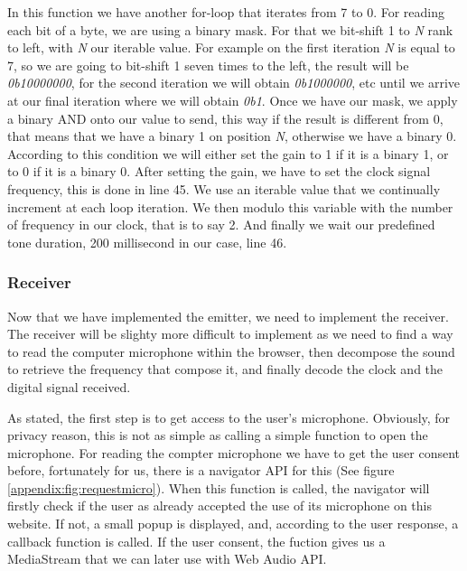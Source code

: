 \documentclass[twocolumn,14pt]{extarticle}
\begin{document}
In this function we have another for-loop that iterates from 7 to 0. For reading each bit of a byte, we are using a binary mask. For that we bit-shift 1 to \textit{N} rank to left, with \textit{N} our iterable value. For example on the first iteration \textit{N} is equal to 7, so we are going to bit-shift 1  seven times to the left, the result will be \textit{0b10000000}, for the second iteration we will obtain \textit{0b1000000}, etc until we arrive at our final iteration where we will obtain \textit{0b1}. Once we have our mask, we apply a binary AND onto our value to send, this way if the result is different from 0, that means that we have a binary 1 on position \textit{N}, otherwise we have a binary 0. According to this condition we will either set the gain to 1 if it is a binary 1, or to 0 if it is a binary 0. After setting the gain, we have to set the clock signal frequency, this is done in line 45. We use an iterable value that we continually increment at each loop iteration. We then modulo this variable with the number of frequency in our clock, that is to say 2. And finally we wait our predefined tone duration, 200 millisecond in our case, line 46.

\subsubsection{Receiver}
Now that we have implemented the emitter, we need to implement the receiver. The receiver will be slighty more difficult to implement as we need to find a way to read the computer microphone within the browser, then decompose the sound to retrieve the frequency that compose it, and finally decode the clock and the digital signal received. 

As stated, the first step is to get access to the user's microphone. Obviously, for privacy reason, this is not as simple as calling a simple function to open the microphone. For reading the compter microphone we have to get the user consent before, fortunately for us, there is a navigator API for this (See figure \ref{appendix:fig:requestmicro}). When this function is called, the navigator will firstly check if the user as already accepted the use of its microphone on this website. If not, a small popup is displayed, and, according to the user response, a callback function is called. If the user consent, the fuction gives us a MediaStream that we can later use with Web Audio API.
\end{document}
